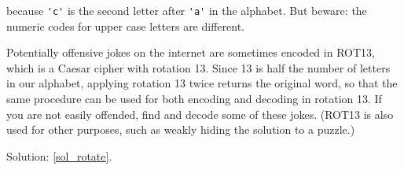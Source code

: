 \begin{exercise}
because \verb"'c'" is the second letter after \verb"'a'" in 
the alphabet.  But beware: the numeric codes for upper case 
letters are different.

Potentially offensive jokes on the internet are sometimes 
encoded in ROT13, which is a Caesar cipher with rotation 13. 
Since 13 is half the number of letters in our alphabet, 
applying rotation 13 twice returns the original word, 
so that the same procedure can be used for both encoding 
and decoding in rotation 13. If you are not
easily offended, find and decode some of these jokes. (ROT13 
is also used for other purposes, such as weakly hiding the 
solution to a puzzle.) 

Solution: \ref{sol_rotate}.

\end{exercise}

